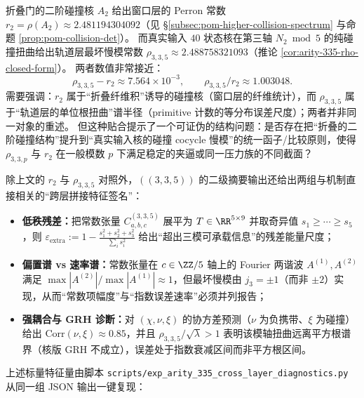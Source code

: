 \begin{remark}\label{rem:arity-335-r2-vs-rho}
折叠门的二阶碰撞核 \(A_2\) 给出窗口层的 Perron 常数 \(r_2=\rho(A_2)\approx 2.481194304092\)（见 \S\ref{subsec:pom-higher-collision-spectrum} 与命题 \ref{prop:pom-collision-det}）。
而真实输入 \(40\) 状态核在第三轴 \(N_2\bmod 5\) 的纯碰撞扭曲给出轨道层最坏慢模常数 \(\rho_{3,3,5}\approx 2.488758321093\)（推论 \ref{cor:arity-335-rho-closed-form}）。
两者数值非常接近：
\[
\rho_{3,3,5}-r_2\approx 7.564\times 10^{-3},
\qquad
\rho_{3,3,5}/r_2\approx 1.003048.
\]
需要强调：\(r_2\) 属于“折叠纤维积”诱导的碰撞核（窗口层的纤维统计），而 \(\rho_{3,3,5}\) 属于“轨道层的单位根扭曲”谱半径（primitive 计数的等分布误差尺度）；两者并非同一对象的重述。
但这种贴合提示了一个可证伪的结构问题：是否存在把“折叠的二阶碰撞结构”提升到“真实输入核的碰撞 cocycle 慢模”的统一函子/比较原则，使得 \(\rho_{3,3,p}\) 与 \(r_2\) 在一般模数 \(p\) 下满足稳定的夹逼或同一压力族的不同截面？
\end{remark}

\begin{remark}\label{rem:arity-335-cross-layer-diagnostics}
除上文的 \(r_2\) 与 \(\rho_{3,3,5}\) 对照外，\(((3,3,5))\) 的二级摘要输出还给出两组与机制直接相关的“跨层拼接特征签名”：
\begin{itemize}
  \item \textbf{低秩残差：}把常数张量 \(C^{(3,3,5)}_{a,b,c}\) 展平为 \(T\in\RR^{5\times 9}\) 并取奇异值 \(s_1\ge\cdots\ge s_5\)，则
  \(
  \varepsilon_{\mathrm{extra}}
  :=1-\frac{s_1^2+s_2^2+s_3^2}{\sum_i s_i^2}
  \)
  给出“超出三模可承载信息”的残差能量尺度；
  \item \textbf{偏置谱 vs 速率谱：}常数张量在 \(c\in\ZZ/5\) 轴上的 Fourier 两谐波 \(A^{(1)},A^{(2)}\) 满足 \(\max|A^{(2)}|/\max|A^{(1)}|\approx 1\)，但最坏慢模由 \(j_3=\pm 1\)（而非 \(\pm 2\)）实现，从而“常数项幅度”与“指数误差速率”必须并列报告；
  \item \textbf{强耦合与 GRH 诊断：}对 \((\chi,\nu,\xi)\) 的协方差预测（\(\nu\) 为负携带、\(\xi\) 为碰撞）给出 \(\mathrm{Corr}(\nu,\xi)\approx 0.85\)，并且 \(\rho_{3,3,5}/\sqrt{\lambda}>1\) 表明该模轴扭曲远离平方根谱界（核版 GRH 不成立），误差处于指数衰减区间而非平方根区间。
\end{itemize}
上述标量特征量由脚本 \texttt{scripts/exp\_arity\_335\_cross\_layer\_diagnostics.py} 从同一组 JSON 输出一键复现：


\end{remark}

